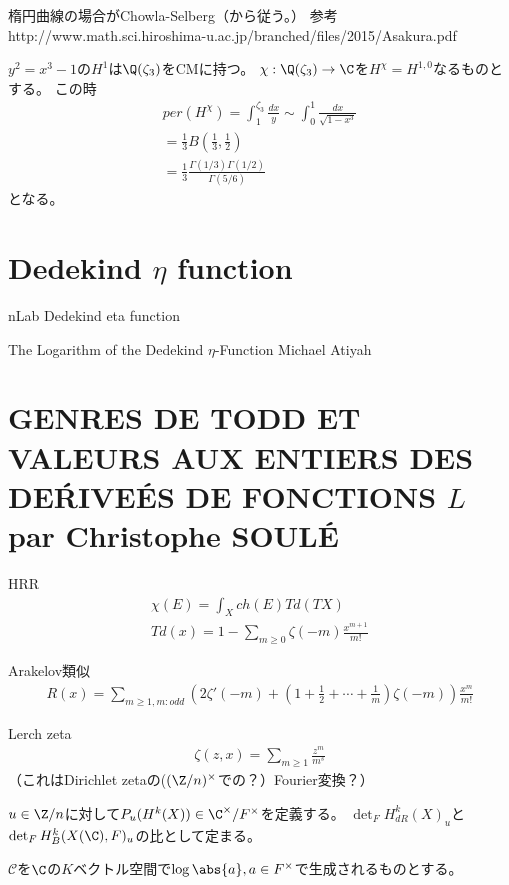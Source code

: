 \documentclass[uplatex, a4paper]{jsbook}
\begin{document}
楕円曲線の場合がChowla-Selberg（から従う。）
参考 http://www.math.sci.hiroshima-u.ac.jp/branched/files/2015/Asakura.pdf

$y^2=x^3-1$の$H^1$は$\Q(\zeta_3)$をCMに持つ。
$\chi:\Q(\zeta_3) \to \C$を$H^\chi=H^{1,0}$なるものとする。
この時
\begin{align*}
per(H^{\chi})=\int^{\zeta_3}_1\frac{dx}{y}\sim\int^1_0\frac{dx}{\sqrt{1-x^3}}\\
=\frac{1}{3}B(\frac{1}{3},\frac{1}{2})\\
=\frac{1}{3}\frac{\Gamma(1/3)\Gamma(1/2)}{\Gamma(5/6)}
\end{align*}
となる。

\section{Dedekind $\eta$ function}
nLab
Dedekind eta function

The Logarithm of the Dedekind $\eta$-Function
Michael Atiyah

\section{GENRES DE TODD ET VALEURS AUX ENTIERS DES DE\'RIVE\'ES DE FONCTIONS $L$
par Christophe SOUL\'E}

HRR
\begin{align*}
\chi(E)=\int_Xch(E)Td(TX)\\
Td(x)=1-\sum_{m\geq0}\zeta(-m)\frac{x^{m+1}}{m!}
\end{align*}

Arakelov類似
\begin{align*}
R(x)=\sum_{m\geq1, m:odd}(2\zeta'(-m)+(1+\frac{1}{2}+\cdots+\frac{1}{m})\zeta(-m))\frac{x^m}{m!}
\end{align*}

Lerch zeta
\begin{align*}
\zeta(z,x)=\sum_{m\geq1}\frac{z^m}{m^s}
\end{align*}
（これはDirichlet zetaの($(\Z/n)^\times$での？）Fourier変換？）

$u\in\Z/n$に対して$P_u(H^k(X))\in\C^\times/F^\times$を定義する。
$\det_FH^k_{dR}(X)_u$と$\det_FH^k_B(X(\C),F)_u$の比として定まる。

$\mathcal{C}$を$\C$の$K$ベクトル空間で$\log\abs{a}, a\in F^\times$で生成されるものとする。
\end{document}
